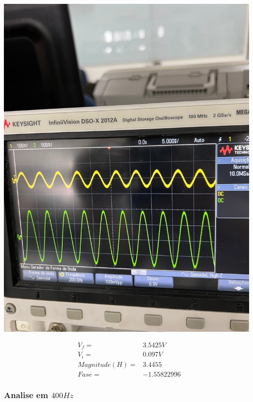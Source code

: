 \documentclass[12pt,twoside, a4paper, twocolumn]{article}
\begin{document}
\begin{adjustbox}{scale=0.18}
    \includegraphics{freq200.jpeg}
\end{adjustbox}


\begin{equation*}
    \begin{aligned}
         & V_f =          & 3.5425V     \\
         & V_i =          & 0.097V      \\
         & Magnitude(H) = & 3.4455      \\
         & Fase =         & -1.55822996
    \end{aligned}
\end{equation*}


\subsubsection{Analise em $400Hz$}
\subparagraph*{}
\end{document}
